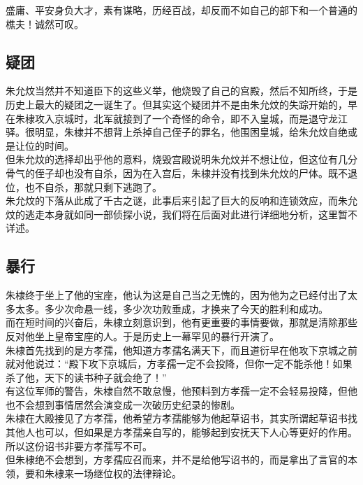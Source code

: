 \begin{multicols}{\theparacolNo}
盛庸、平安身负大才，素有谋略，历经百战，却反而不如自己的部下和一个普通的樵夫！诚然可叹。\\

\subsection{疑团}
朱允炆当然并不知道臣下的这些义举，他烧毁了自己的宫殿，然后不知所终，于是历史上最大的疑团之一诞生了。但其实这个疑团并不是由朱允炆的失踪开始的，早在朱棣攻入京城时，北军就接到了一个奇怪的命令，即不入皇城，而是退守龙江驿。很明显，朱棣并不想背上杀掉自己侄子的罪名，他围困皇城，给朱允炆自绝或是让位的时间。\\

但朱允炆的选择却出乎他的意料，烧毁宫殿说明朱允炆并不想让位，但这位有几分骨气的侄子却也没有自杀，因为在入宫后，朱棣并没有找到朱允炆的尸体。既不退位，也不自杀，那就只剩下逃跑了。\\

朱允炆的下落从此成了千古之谜，此事后来引起了巨大的反响和连锁效应，而朱允炆的逃走本身就如同一部侦探小说，我们将在后面对此进行详细地分析，这里暂不详述。\\

\subsection{暴行}
朱棣终于坐上了他的宝座，他认为这是自己当之无愧的，因为他为之已经付出了太多太多。多少次命悬一线，多少次功败垂成，才换来了今天的胜利和成功。\\

而在短时间的兴奋后，朱棣立刻意识到，他有更重要的事情要做，那就是清除那些反对他坐上皇帝宝座的人。于是历史上一幕罕见的暴行开演了。\\

朱棣首先找到的是方孝孺，他知道方孝孺名满天下，而且道衍早在他攻下京城之前就对他说过：“殿下攻下京城后，方孝孺一定不会投降，但你一定不能杀他！如果杀了他，天下的读书种子就会绝了！”\\

有这位军师的警告，朱棣自然不敢怠慢，他预料到方孝孺一定不会轻易投降，但他也不会想到事情居然会演变成一次破历史纪录的惨剧。\\

朱棣在大殿接见了方孝孺，他希望方孝孺能够为他起草诏书，其实所谓起草诏书找其他人也可以，但如果是方孝孺亲自写的，能够起到安抚天下人心等更好的作用。所以这份诏书非要方孝孺写不可。\\

但朱棣绝不会想到，方孝孺应召而来，并不是给他写诏书的，而是拿出了言官的本领，要和朱棣来一场继位权的法律辩论。\\


\end{multicols}
